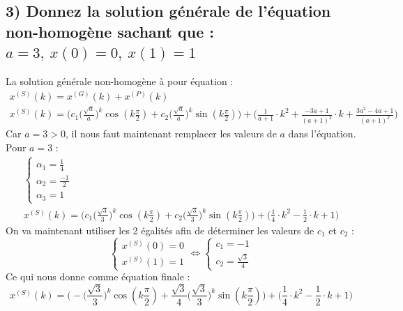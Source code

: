 \documentclass[11pt,a4paper]{report}
\begin{document}
		\subsection*{3) Donnez la solution générale de l'équation non-homogène sachant que : $a=3,\ x(0) = 0,\ x(1) = 1$}		
			La solution générale non-homogène à pour équation :
			\begin{gather*}
				x^{(S)}(k) = x^{(G)}(k) + x^{(P)}(k)\\
				x^{(S)}(k) = \Big(c_1 \Big(\frac{\sqrt{a}}{a} \Big)^k \cos(k \frac{\pi}{2}) + c_2\Big(\frac{\sqrt{a}}{a}\Big)^k \sin(k \frac{\pi}{2})\Big) + \Big(\frac{1}{a+1} \cdot k^2 + \frac{-3a + 1}{(a+1)^2} \cdot k + \frac{3a^2-4a+1}{(a+1)^2}\Big)
			\end{gather*}
			Car $a = 3 > 0$, il nous faut maintenant remplacer les valeurs de $a$ dans l'équation. Pour $a=3$ : 
			\begin{gather*}
				\begin{cases} 
					\alpha_1 = \frac{1}{4}\\ 
					\alpha_2 = \frac{-1}{2} \\
					\alpha_3 = 1
				\end{cases} \\
				x^{(S)}(k) = \Big(c_1 \Big(\frac{\sqrt{3}}{3} \Big)^k \cos(k \frac{\pi}{2}) + c_2\Big(\frac{\sqrt{3}}{3}\Big)^k \sin(k \frac{\pi}{2})\Big) + \Big(\frac{1}{4} \cdot k^2 - \frac{1}{2} \cdot k + 1 \Big)
			\end{gather*}
			On va maintenant utiliser les 2 égalités afin de déterminer les valeurs de $c_1$ et $c_2$ :
			\[
				\begin{cases} 
					x^{(S)}(0) = 0\\ 
					x^{(S)}(1) = 1 
				\end{cases} \Leftrightarrow
				\begin{cases} 
					c_1 = -1\\ 
					c_2 = \frac{\sqrt{3}}{4} 
				\end{cases}
			\]
			Ce qui nous donne comme équation finale : 
			\[
				x^{(S)}(k) = \Big( -\Big(\frac{\sqrt{3}}{3} \Big)^k \cos(k \frac{\pi}{2}) + \frac{\sqrt{3}}{4} \Big(\frac{\sqrt{3}}{3}\Big)^k \sin(k \frac{\pi}{2})\Big) + \Big(\frac{1}{4} \cdot k^2 - \frac{1}{2} \cdot k + 1 \Big)
			\]
			
\end{document}
